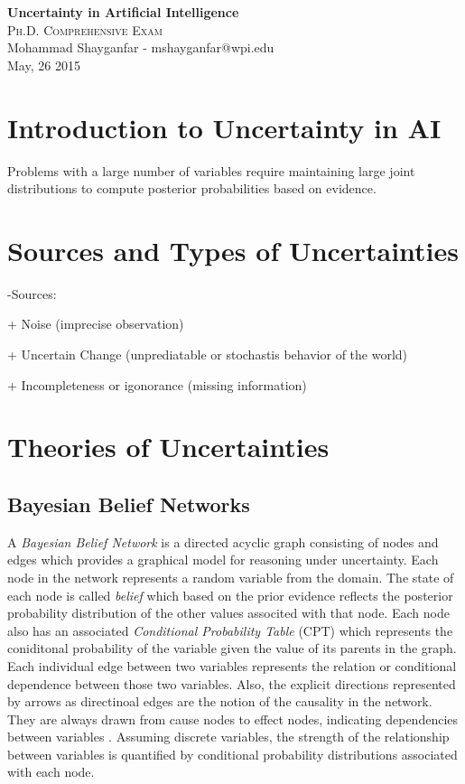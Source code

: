 \documentclass[11pt]{article}
\begin{document}

\begin{center}
{\LARGE{\textbf{Uncertainty in Artificial Intelligence}}} \\
\Large\textsc{Ph.D. Comprehensive Exam} \\[1em]
\large\textnormal{Mohammad Shayganfar - mshayganfar@wpi.edu} \\
\large\textnormal{May, 26 2015}
\end{center}

\section{Introduction to Uncertainty in AI}

Problems with a large number of variables require maintaining large joint
distributions to compute posterior probabilities based on evidence.

\section{Sources and Types of Uncertainties}

-Sources:

+ Noise (imprecise observation)

+ Uncertain Change (unprediatable or stochastis behavior of the world)

+ Incompleteness or igonorance (missing information)

\section{Theories of Uncertainties}

\subsection{Bayesian Belief Networks}

A \textit{Bayesian Belief Network} is a  directed acyclic graph consisting of
nodes and edges which provides a graphical model for reasoning under
uncertainty. Each node in the network represents a random variable from the
domain. The state of each node is called \textit{belief} which based on the
prior evidence reflects the posterior probability distribution of the other
values associted with that node. Each node also has an associated
\textit{Conditional Probability Table} (CPT) which represents the coniditonal
probability of the variable given the value of its parents in the graph. Each
individual edge between two variables represents the relation or conditional
dependence between those two variables. Also, the explicit directions
represented by arrows as directinoal edges are the notion of the causality in
the network. They are always drawn from cause nodes to effect nodes, indicating
dependencies between variables \cite{das:decision-making-agents}. Assuming
discrete variables, the strength of the relationship between variables is
quantified by conditional probability distributions associated with each node.
\end{document}
